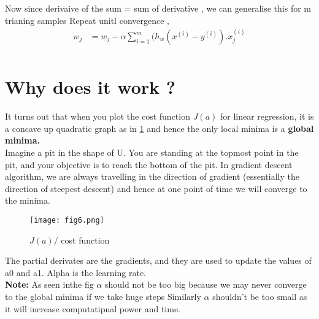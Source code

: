 \documentclass[a4paper, 11pt]{article}
\begin{document}
Now since derivaive of the sum = sum of derivative , we can generalise this for m trianing samples
Repeat unitl convergence ,
\begin{align}
    w_j &= w_j - \alpha \sum_{i=1}^{m}(h_w(x^{(i)} - y^{(i)}).x_j^{(i)}\\
\end{align}

\section{Why does it work ?} 
It turns out that when you plot the cost function $J(a)$ for linear regression, it is a concave up quadratic graph as in \ref{fig:fig6} and hence the only local minima is a \textbf{global minima.} \\
Imagine a pit in the shape of U. You are standing at the topmost point in the pit, and your objective is to reach the bottom of the pit. In gradient descent algorithm, we are always travelling in the direction of gradient (essentially the direction of steepest descent) and hence at one point of time we will converge to the minima.\\
\begin{figure}[h!]
    \texttt{[image: fig6.png]}
    \caption{$J(a) /$ cost function}
    \label{fig:fig6}
  \end{figure}
  The partial derivates are the gradients, and they are used to update the values of a0 and a1. Alpha is the learning rate.
 \\ \textbf{Note:} As seen inthe fig $\alpha$ should not be too big because we may never converge to the global minima if we take huge steps
Similarly $\alpha$ shouldn't be too small as it will increase computatipnal power and time.



\end{document}
